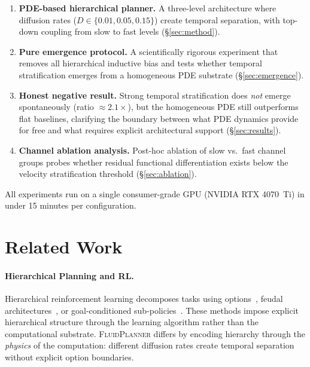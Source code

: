 \documentclass{article}
\newcommand{\fluidplanner}{\textsc{FluidPlanner}}
\begin{document}
\begin{enumerate}
    \item \textbf{PDE-based hierarchical planner.} A three-level architecture where diffusion rates ($D \in \{0.01, 0.05, 0.15\}$) create temporal separation, with top-down coupling from slow to fast levels (\S\ref{sec:method}).
    \item \textbf{Pure emergence protocol.} A scientifically rigorous experiment that removes all hierarchical inductive bias and tests whether temporal stratification emerges from a homogeneous PDE substrate (\S\ref{sec:emergence}).
    \item \textbf{Honest negative result.} Strong temporal stratification does \emph{not} emerge spontaneously (ratio $\approx 2.1\times$), but the homogeneous PDE still outperforms flat baselines, clarifying the boundary between what PDE dynamics provide for free and what requires explicit architectural support (\S\ref{sec:results}).
    \item \textbf{Channel ablation analysis.} Post-hoc ablation of slow vs.\ fast channel groups probes whether residual functional differentiation exists below the velocity stratification threshold (\S\ref{sec:ablation}).
\end{enumerate}

All experiments run on a single consumer-grade GPU (NVIDIA RTX 4070~Ti) in under 15 minutes per configuration.

\section{Related Work}
\label{sec:related}

\paragraph{Hierarchical Planning and RL.}
Hierarchical reinforcement learning decomposes tasks using options~\cite{kulkarni2016hierarchical}, feudal architectures~\cite{vezhnevets2017feudal}, or goal-conditioned sub-policies~\cite{nachum2018hiro}. These methods impose explicit hierarchical structure through the learning algorithm rather than the computational substrate. \fluidplanner{} differs by encoding hierarchy through the \emph{physics} of the computation: different diffusion rates create temporal separation without explicit option boundaries.
\end{document}
